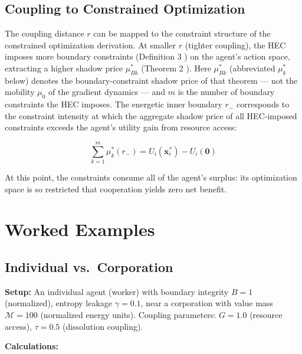 \documentclass[11pt]{article}
\theoremstyle{plain}
\theoremstyle{definition}
\theoremstyle{remark}
\let\origsection\section
\renewcommand{\section}{\needspace{12\baselineskip}\origsection}
\let\origsubsection\subsection
\renewcommand{\subsection}{\needspace{7\baselineskip}\origsubsection}
\begin{document}
\subsection{Coupling to Constrained
Optimization}\label{coupling-to-constrained-optimization}

The coupling distance \(r\) can be mapped to the constraint structure of
the constrained optimization derivation. At smaller \(r\) (tighter
coupling), the HEC imposes more boundary constraints (Definition 3
\citep{TC-I}) on the agent's action space, extracting a higher shadow
price \(\mu_{Bk}^*\) (Theorem 2 \citep{TC-I}). Here \(\mu_{Bk}^*\)
(abbreviated \(\mu_k^*\) below) denotes the boundary-constraint shadow
price of that theorem --- not the mobility \(\mu_0\) of the gradient
dynamics --- and \(m\) is the number of boundary constraints the HEC
imposes. The energetic inner boundary \(r_-\) corresponds to the
constraint intensity at which the aggregate shadow price of all
HEC-imposed constraints exceeds the agent's utility gain from resource
access:

\[\sum_{k=1}^{m} \mu_k^*(r_-) = U_i(\mathbf{x}_i^*) - U_i(\mathbf{0})\]

At this point, the constraints consume all of the agent's surplus: its
optimization space is so restricted that cooperation yields zero net
benefit.

\section{Worked Examples}\label{worked-examples}

\subsection{Individual
vs.~Corporation}\label{individual-vs.-corporation}

\textbf{Setup:} An individual agent (worker) with boundary integrity
\(B = 1\) (normalized), entropy leakage \(\gamma = 0.1\), near a
corporation with value mass \(\mathcal{M} = 100\) (normalized energy
units). Coupling parameters: \(G = 1.0\) (resource access),
\(\tau = 0.5\) (dissolution coupling).

\textbf{Calculations:}
\end{document}
